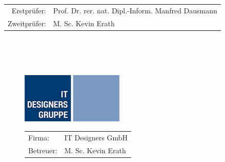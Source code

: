 \begin{titlepage}
\begin{tabular}{rl}
		Erstprüfer: & Prof. Dr. rer. nat. Dipl.-Inform. Manfred Dausmann\\
		Zweitprüfer: & M. Sc. Kevin Erath\\
	\end{tabular}
	~\\ ~\\ ~\\	
	\begin{figure}[H]
		\begin{minipage}{0.4\textwidth}
			\begin{center}
				\includegraphics[width=.8\textwidth]{images/itd_logo}
			\end{center}
		\end{minipage}%
		\begin{minipage}{0.7\textwidth}
			\begin{tabular}{ll}
				Firma: & IT Designers GmbH\\
				Betreuer: & M. Sc. Kevin Erath
			\end{tabular}
		\end{minipage}
	\end{figure}
\end{titlepage}





